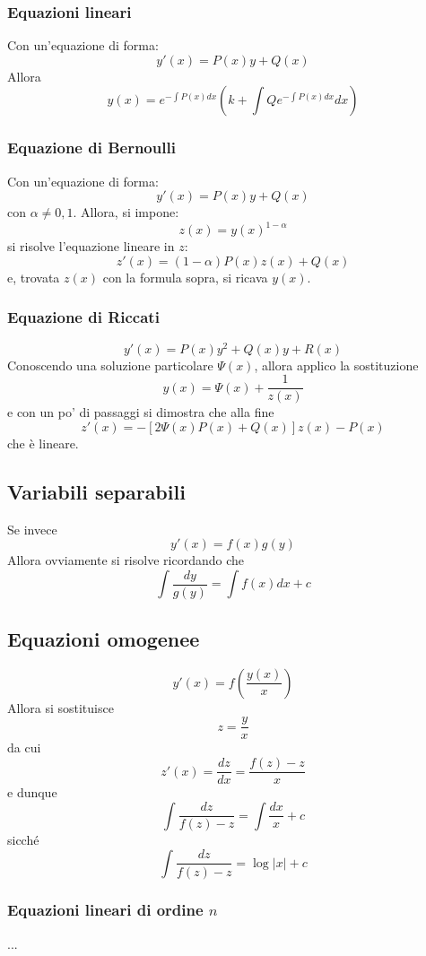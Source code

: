 \documentclass[a4paper,12pt]{article}
\begin{document}
\subsubsection{Equazioni lineari}
Con un'equazione di forma:
$$y'(x) = P(x)y+Q(x)$$
Allora
$$y(x)=e^{- \displaystyle\int P(x)dx}\left(k + \int Qe^{-\displaystyle\int P(x)dx}dx\right)$$
\subsubsection{Equazione di Bernoulli}
Con un'equazione di forma:
$$y'(x) = P(x)y+Q(x)$$
con $\alpha \neq 0, 1$. Allora, si impone:
$$ z(x)=y(x)^{1-\alpha} $$
si risolve l'equazione lineare in $z$: $$z'(x)=(1-\alpha)P(x)z(x)+Q(x)$$ e, trovata $z(x)$ con la formula sopra, si ricava $y(x)$.

\subsubsection{Equazione di Riccati}
$$y'(x) = P(x)y^2+Q(x)y+R(x)$$
Conoscendo una soluzione particolare $\Psi(x)$, allora applico la sostituzione
$$y(x)=\Psi(x)+\dfrac{1}{z(x)}$$
e con un po' di passaggi si dimostra che alla fine
$$z'(x)= -\left[2\Psi(x)P(x)+Q(x)\right]z(x)-P(x)$$
che è lineare.
\subsection{Variabili separabili}
Se invece
$$y'(x) = f(x)g(y)$$
Allora ovviamente si risolve ricordando che
$$\int\dfrac{dy}{g(y)}=\int f(x)dx + c$$
\subsection{Equazioni omogenee}
$$y'(x) = f\left(\dfrac{y(x)}{x}\right)$$
Allora si sostituisce
$$z=\dfrac{y}{x}$$
da cui $$z'(x) = \dfrac{dz}{dx} = \dfrac{f(z)-z}{x}$$
e dunque
$$\int\dfrac{dz}{f(z)-z}=\int \dfrac{dx}{x} + c$$
sicché
$$\int\dfrac{dz}{f(z)-z} = \log|x| + c$$
\subsubsection{Equazioni lineari di ordine $n$}
...
\end{document}
